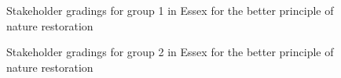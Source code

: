 \documentclass[
  12pt,
  letterpaper,
  DIV=11,
  numbers=noendperiod]{scrartcl}
\begin{document}
\begin{figure}[H]


\caption{\label{fig-EsBetterG1}Stakeholder gradings for group 1 in Essex
for the better principle of nature restoration}

\end{figure}%

\begin{figure}[H]


\caption{\label{fig-EsBetterG2}Stakeholder gradings for group 2 in Essex
for the better principle of nature restoration}

\end{figure}%
\end{document}
